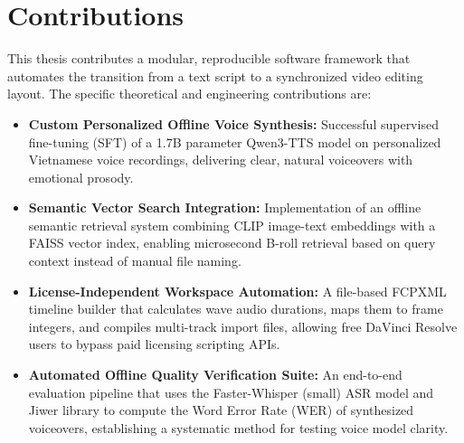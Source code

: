 \documentclass[a4paper,12pt]{report}
\begin{document}
\section{Contributions}
This thesis contributes a modular, reproducible software framework that automates the transition from a text script to a synchronized video editing layout. The specific theoretical and engineering contributions are:
\begin{itemize}
    \item \textbf{Custom Personalized Offline Voice Synthesis:} Successful supervised fine-tuning (SFT) of a 1.7B parameter Qwen3-TTS model on personalized Vietnamese voice recordings, delivering clear, natural voiceovers with emotional prosody.
    \item \textbf{Semantic Vector Search Integration:} Implementation of an offline semantic retrieval system combining CLIP image-text embeddings with a FAISS vector index, enabling microsecond B-roll retrieval based on query context instead of manual file naming.
    \item \textbf{License-Independent Workspace Automation:} A file-based FCPXML timeline builder that calculates wave audio durations, maps them to frame integers, and compiles multi-track import files, allowing free DaVinci Resolve users to bypass paid licensing scripting APIs.
    \item \textbf{Automated Offline Quality Verification Suite:} An end-to-end evaluation pipeline that uses the Faster-Whisper (small) ASR model and Jiwer library to compute the Word Error Rate (WER) of synthesized voiceovers, establishing a systematic method for testing voice model clarity.
\end{itemize}
\end{document}
